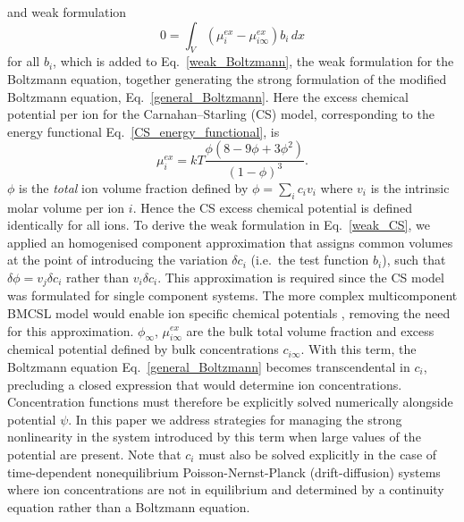 and weak formulation
\begin{equation}
    0 = \int_{V} (\mu_i^{ex}-\mu_{i\infty}^{ex}) b_i \, dx
    \label{weak_CS}
\end{equation}
for all $b_i$, which is added to Eq.~\eqref{weak_Boltzmann}, the weak
formulation for the Boltzmann equation, together generating the strong
formulation of the modified Boltzmann
equation,  Eq.~\eqref{general_Boltzmann}.  Here the excess chemical potential
per ion for the Carnahan--Starling (CS) model, corresponding to the energy
functional Eq.~\eqref{CS_energy_functional}, is
\begin{equation}
    \mu_{i}^{ex} = kT \frac{\phi(8-9\phi+3\phi^2)}{(1-\phi)^3}.
    \label{chem_pot_CS}
\end{equation}
$\phi$ is the \emph{total} ion volume fraction defined by
$\phi=\sum_i c_i v_i$ where $v_i$ is the intrinsic molar volume per
ion $i$. Hence the CS excess chemical potential is defined identically
for all ions. To derive the weak formulation in Eq.~\eqref{weak_CS}, we
applied an homogenised component approximation that assigns common
volumes at the point of introducing the variation  $\delta c_i$ (i.e.\
the test function $b_i$), such that $\delta\phi=v_j \delta c_i$ rather 
than $v_i \delta c_i$. This approximation is required since the CS
model was formulated for single component systems. The more complex
multicomponent BMCSL model would enable ion specific chemical
potentials \citep{MansooriCarnahanStarlingLeland1971}, removing the
need for this approximation.  $\phi_{\infty}$, $\mu_{i\infty}^{ex}$
are the bulk total volume fraction and excess chemical potential
defined by bulk concentrations $c_{i\infty}$. With this term, the
Boltzmann equation Eq.~\eqref{general_Boltzmann} becomes transcendental in $c_i$, precluding a closed
expression that would determine ion concentrations. Concentration functions must therefore be
explicitly solved  numerically alongside potential $\psi$. In this
paper we address strategies for managing the strong nonlinearity in
the system introduced by this term when large values of the
potential are present. Note that $c_i$ must also be solved explicitly in the case
of time-dependent nonequilibrium Poisson-Nernst-Planck (drift-diffusion) systems \citep{LopezGarciaHornoGrosse2018} where
ion concentrations are not in equilibrium and determined by a
continuity equation rather than a Boltzmann equation.


